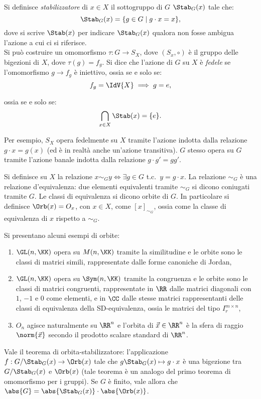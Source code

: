 \documentclass[10pt,landscape]{article}
\begin{document}
\begin{multicols}{3}
		\vskip 0.05in
		
		Si definisce \textit{stabilizzatore} di $x \in X$ il sottogruppo di $G$ $\Stab_G(x)$
		tale che:
		\[ \Stab_G(x)= \{g\in G \mid g \cdot x=x\}, \]
		dove si scrive $\Stab(x)$ per indicare $\Stab_G(x)$ qualora non fosse ambigua
		l'azione a cui ci si riferisce. \\

		Si può costruire un omomorfismo $\tau : G \rightarrow S_X$, dove $(S_x, \circ)$ è il gruppo delle bigezioni di $X$, dove $\tau(g) = f_g$. Si dice che l'azione di $G$ su $X$ è \textit{fedele} se l'omomorfismo $g \rightarrow f_g$ è iniettivo, ossia
		se e solo se:
		\[ f_g = \IdV{X} \implies g = e, \]
		
		ossia se e solo se:
		\[ \bigcap_{x \in X} \Stab(x) = \{e\}. \]
		
		Per esempio, $S_X$ opera fedelmente su $X$ tramite l'azione indotta dalla relazione $g \cdot x=g(x)$ (ed è in realtà anche un'azione transitiva). $G$ stesso opera su $G$
		tramite l'azione banale indotta dalla relazione $g \cdot g'=gg'$.
		
		Si definisce su $X$ la relazione $x \sim_G y \iff \exists g \in G$ t.c.~$y=g \cdot x$.
		La relazione $\sim_G$ è una relazione d'equivalenza: due elementi equivalenti tramite $\sim_G$ si dicono coniugati tramite $G$. Le classi di equivalenza si dicono orbite di $G$. In particolare si definisce $\Orb(x) = O_x$, con $x \in X$, come $[x]_{\sim_G}$,
		ossia come la classe di equivalenza di $x$ rispetto a $\sim_G$.
		
		Si presentano alcuni esempi di orbite:
		\begin{enumerate}
			\item $\GL(n,\KK)$ opera su $M(n,\KK)$ tramite la similitudine e le orbite sono le classi di matrici simili, rappresentate dalle forme canoniche di Jordan,
			\item $\GL(n,\KK)$ opera su $\Sym(n,\KK)$ tramite la congruenza e le orbite sono le classi di matrici congruenti, rappresentate in $\RR$ dalle matrici diagonali con $1$, $-1$ e $0$ come elementi, e in $\CC$ dalle stesse matrici rappresentanti delle classi
			di equivalenza della SD-equivalenza, ossia le matrici del tipo $I_r^{m \times n}$,
			\item $O_n$ agisce naturalmente su $\RR^n$ e l'orbita di $\vec x \in \RR^n$ è la sfera di raggio $\norm{\vec x}$ secondo il prodotto scalare standard di $\RR^n$. 
		\end{enumerate}
		
		Vale il teorema di orbita-stabilizzatore: l'applicazione $f:G/\Stab_G(x) \rightarrow \Orb(x)$ tale che $g \Stab_G(x) \mapsto g \cdot x$ è una bigezione tra
		$G/\Stab_G(x)$ e $\Orb(x)$ (tale teorema è un analogo del primo teorema di
		omomorfismo per i gruppi). Se $G$ è finito, vale allora che $\abs{G} = \abs{\Stab_G(x)} \cdot \abs{\Orb(x)}$.
		

\end{multicols}
\end{document}
